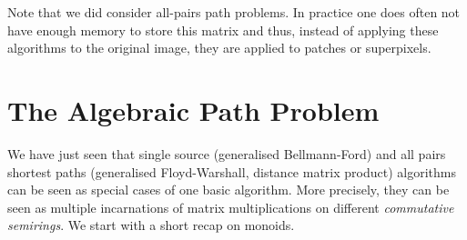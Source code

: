 Note that we did consider all-pairs path problems. In practice one does often
not have enough memory to store this matrix and thus, instead of applying these
algorithms to the original image, they are applied to patches or superpixels.

\section{The Algebraic Path Problem}
We have just seen that single source (generalised Bellmann-Ford) and all pairs
shortest paths (generalised Floyd-Warshall, distance matrix product) algorithms
can be seen as special cases of one basic algorithm. More precisely, they can be
seen as multiple incarnations of matrix multiplications on different
\emph{commutative semirings}.  We start with a short recap on monoids.

